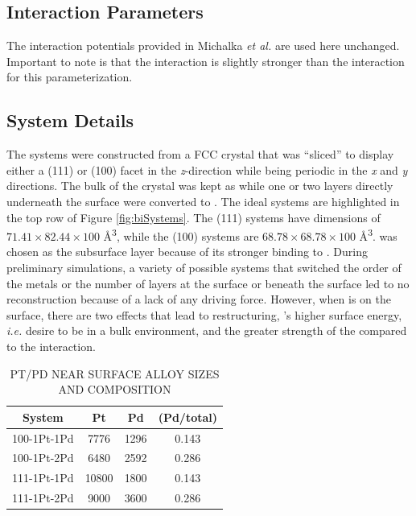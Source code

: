 \subsection{Interaction Parameters}
The interaction potentials provided in Michalka {\em et
al.}\citep{Michalka:2015aa} are used here unchanged. Important to note is that
the  interaction is slightly stronger than the
 interaction for this parameterization.

\subsection{System Details}
The systems were constructed from a FCC  crystal that was ``sliced'' to
display either a (111) or (100) facet in the {\em z}-direction while being
periodic in the {\em x} and {\em y} directions. The bulk of the crystal was
kept as  while one or two layers directly underneath the surface were
converted to . The ideal systems are highlighted in the top row of
Figure \ref{fig:biSystems}. The (111) systems have dimensions of
$71.41\times82.44\times100$ \AA\textsuperscript{3}, while the (100) systems are
$68.78\times68.78\times100$ \AA\textsuperscript{3}.  was chosen as the
subsurface layer because of its stronger binding to . During preliminary
simulations, a variety of possible systems that switched the order of the
metals or the number of layers at the surface or beneath the surface led to no
reconstruction because of a lack of any driving force.  However, when 
is on the surface, there are two effects that lead to restructuring, 's
higher surface energy, {\em i.e.} desire to be in a bulk environment, and the
greater strength of the  compared to the 
interaction.

\begin{table}
  \caption{PT/PD NEAR SURFACE ALLOY SIZES AND COMPOSITION}
  \centering
  \begin{threeparttable}
  \begin{tabular}{ c ccc }
  \hline
  \hline
  \textbf{System} & \textbf{Pt} & \textbf{Pd} &  \textbf{(Pd/total)} \\
  \hline
  100-1Pt-1Pd & 7776 & 1296  & 0.143 \\
  100-1Pt-2Pd & 6480  & 2592  & 0.286 \\
  111-1Pt-1Pd & 10800  & 1800  & 0.143 \\
  111-1Pt-2Pd & 9000 & 3600  & 0.286 \\
  \hline
  \hline
  \end{tabular}
  \end{threeparttable}
\label{tab:systems1}
\end{table}


